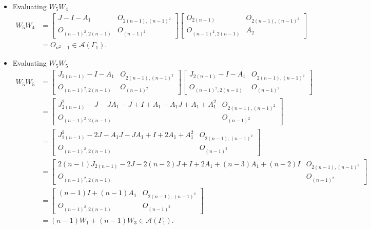 \begin{itemize}
    \item Evaluating $W_5W_4$
    \begin{align*}
        W_5W_4
        &= \begin{bmatrix}
            J-I-A_1 & O_{2(n-1), (n-1)^2} \\
            O_{(n-1)^2, 2(n-1)} & O_{(n-1)^2}
        \end{bmatrix}\begin{bmatrix}
            O_{2(n-1)} & O_{2(n-1), (n-1)^2} \\
            O_{(n-1)^2, 2(n-1)} & A_2
        \end{bmatrix}\\
        &= O_{n^2-1}\in\mathcal{A}(\Gamma_1).
    \end{align*}
    
    \item Evaluating $W_5W_5$
    \begin{align*}
        W_5W_5
        &= \begin{bmatrix}
            J_{2(n-1)}-I-A_1 & O_{2(n-1), (n-1)^2} \\
            O_{(n-1)^2, 2(n-1)} & O_{(n-1)^2}
        \end{bmatrix}\begin{bmatrix}
            J_{2(n-1)}-I-A_1 & O_{2(n-1), (n-1)^2} \\
            O_{(n-1)^2, 2(n-1)} & O_{(n-1)^2}
        \end{bmatrix}\\
        &= \begin{bmatrix}
            J_{2(n-1)}^2-J-JA_1-J+I+A_1 - A_1J + A_1+A_1^2 & O_{2(n-1), (n-1)^2} \\
            O_{(n-1)^2, 2(n-1)} & O_{(n-1)^2}
        \end{bmatrix}\\
        &= \begin{bmatrix}
            J_{2(n-1)}^2- 2J-A_1J-JA_1+I+2A_1+A_1^2 & O_{2(n-1), (n-1)^2} \\
            O_{(n-1)^2, 2(n-1)} & O_{(n-1)^2}
        \end{bmatrix}\\
        &= \begin{bmatrix}
            2(n-1)J_{2(n-1)}-2J-2(n-2)J + I+2A_1 +(n-3)A_1+(n-2)I & O_{2(n-1), (n-1)^2} \\
            O_{(n-1)^2, 2(n-1)} & O_{(n-1)^2}
        \end{bmatrix}\\
        &= \begin{bmatrix}
            (n-1)I+(n-1)A_1 & O_{2(n-1), (n-1)^2} \\
            O_{(n-1)^2, 2(n-1)} & O_{(n-1)^2}
        \end{bmatrix}\\
        &=(n-1)W_1 + (n-1)W_3\in\mathcal{A}(\Gamma_1).
    \end{align*}
    

\end{itemize}
